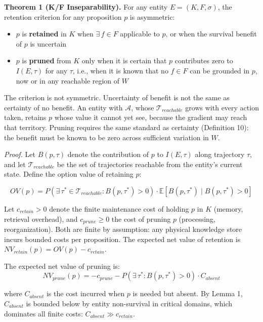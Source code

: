 \documentclass[
]{article}
\providecommand{\tightlist}{%
  \setlength{\itemsep}{0pt}\setlength{\parskip}{0pt}}
\begin{document}
\textbf{Theorem 1 (K/F Inseparability).} For any entity
\(E = (K, F, \sigma)\), the retention criterion for any proposition
\(p\) is asymmetric:

\begin{itemize}
\tightlist
\item
  \(p\) is \textbf{retained} in \(K\) when \(\exists\, f \in F\)
  applicable to \(p\), or when the survival benefit of \(p\) is
  uncertain
\item
  \(p\) is \textbf{pruned} from \(K\) only when it is certain that \(p\)
  contributes zero to \(I(E, \tau)\) for any \(\tau\), i.e., when it is
  known that no \(f \in F\) can be grounded in \(p\), now or in any
  reachable region of \(W\)
\end{itemize}

The criterion is not symmetric. Uncertainty of benefit is not the same
as certainty of no benefit. An entity with \(\mathcal{A}\), whose
\(\mathcal{T}_{reachable}\) grows with every action taken, retains \(p\)
whose value it cannot yet see, because the gradient may reach that
territory. Pruning requires the same standard as certainty (Definition
10): the benefit must be known to be zero across sufficient variation in
\(W\).

\emph{Proof.} Let \(B(p, \tau)\) denote the contribution of \(p\) to
\(I(E, \tau)\) along trajectory \(\tau\), and let
\(\mathcal{T}_{reachable}\) be the set of trajectories reachable from
the entity's current state. Define the option value of retaining \(p\):

\[OV(p) = P\!\left(\exists\,\tau^* \in \mathcal{T}_{reachable} : B(p, \tau^*) > 0\right) \cdot \mathbb{E}\!\left[B(p,\tau^*) \mid B(p, \tau^*) > 0\right]\]

Let \(c_{retain} > 0\) denote the finite maintenance cost of holding
\(p\) in \(K\) (memory, retrieval overhead), and \(c_{prune} \geq 0\)
the cost of pruning \(p\) (processing, reorganization). Both are finite
by assumption: any physical knowledge store incurs bounded costs per
proposition. The expected net value of retention is
\(NV_{retain}(p) = OV(p) - c_{retain}\).

The expected net value of pruning is:
\[NV_{prune}(p) = -c_{prune} - P\!\left(\exists\,\tau^* : B(p,\tau^*) > 0\right) \cdot C_{absent}\]

where \(C_{absent}\) is the cost incurred when \(p\) is needed but
absent. By Lemma 1, \(C_{absent}\) is bounded below by entity
non-survival in critical domains, which dominates all finite costs:
\(C_{absent} \gg c_{retain}\).
\end{document}
